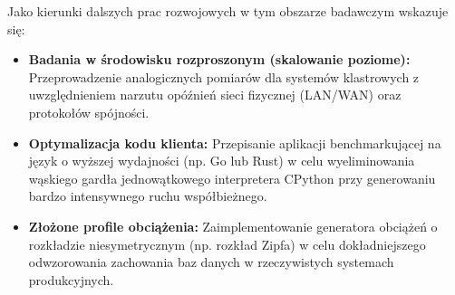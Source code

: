 Jako kierunki dalszych prac rozwojowych w tym obszarze badawczym wskazuje się:
\begin{itemize}
    \item \textbf{Badania w środowisku rozproszonym (skalowanie poziome):} Przeprowadzenie analogicznych pomiarów dla systemów klastrowych z uwzględnieniem narzutu opóźnień sieci fizycznej (LAN/WAN) oraz protokołów spójności.
    \item \textbf{Optymalizacja kodu klienta:} Przepisanie aplikacji benchmarkującej na język o wyższej wydajności (np. Go lub Rust) w celu wyeliminowania wąskiego gardła jednowątkowego interpretera CPython przy generowaniu bardzo intensywnego ruchu współbieżnego.
    \item \textbf{Złożone profile obciążenia:} Zaimplementowanie generatora obciążeń o rozkładzie niesymetrycznym (np. rozkład Zipfa) w celu dokładniejszego odwzorowania zachowania baz danych w rzeczywistych systemach produkcyjnych.
\end{itemize}